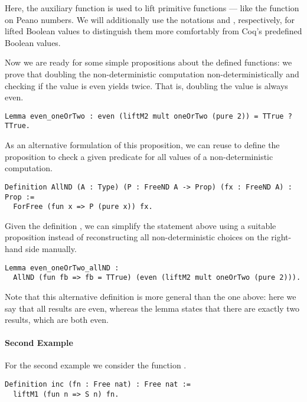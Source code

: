 Here, the auxiliary function  is used to lift primitive functions --- like the  function on Peano numbers.
We will additionally use the notations  and , respectively, for lifted Boolean values to distinguish them more comfortably from Coq's predefined Boolean values.

Now we are ready for some simple propositions about the defined functions: we prove that doubling the non\--deterministic computation  non\--deterministically and checking if the value is even yields  twice.
That is, doubling the value  is always even.

\begin{verbatim}
Lemma even_oneOrTwo : even (liftM2 mult oneOrTwo (pure 2)) = TTrue ? TTrue.
\end{verbatim}

As an alternative formulation of this proposition, we can reuse  to define the proposition  to check a given predicate for all values of a non\--deterministic computation.

\begin{verbatim}
Definition AllND (A : Type) (P : FreeND A -> Prop) (fx : FreeND A) : Prop :=
  ForFree (fun x => P (pure x)) fx.
\end{verbatim}

Given the definition , we can simplify the statement above using a suitable proposition instead of reconstructing all non\--deterministic choices on the right\--hand side manually.

\begin{verbatim}
Lemma even_oneOrTwo_allND :
  AllND (fun fb => fb = TTrue) (even (liftM2 mult oneOrTwo (pure 2))).
\end{verbatim}

Note that this alternative definition is more general than the one above: here we say that all results are even, whereas the lemma  states that there are exactly two results, which are both even.

\paragraph{Second Example}
For the second example we consider the function .

\begin{verbatim}
Definition inc (fn : Free nat) : Free nat :=
  liftM1 (fun n => S n) fn.
\end{verbatim}


